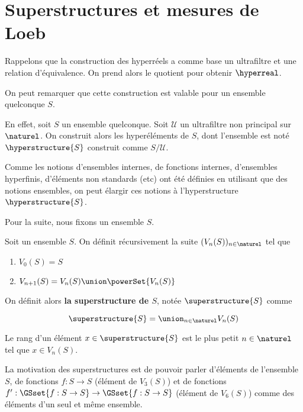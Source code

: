 \chapter{Superstructures et mesures de Loeb}

Rappelons que la construction des hyperréels a comme base un ultrafiltre et une
relation d'équivalence. On prend alors le quotient pour obtenir $\hyperreal$.

On peut remarquer que cette construction est valable pour un ensemble quelconque
$S$.

En effet, soit $S$ un ensemble quelconque. Soit $\mathcal{U}$ un ultrafiltre non
principal sur $\naturel$. On construit alors les hyperéléments de $S$, dont
l'ensemble est noté $\hyperstructure{S}$ construit comme
$S/\mathcal{U}$.

Comme les notions d'ensembles internes, de fonctions internes, d'ensembles
hyperfinis, d'éléments non standards (etc) ont été définies en utilisant que des
notions ensembles, on peut élargir ces notions à l'hyperstructure
$\hyperstructure{S}$.

Pour la suite, nous fixons un ensemble $S$.


\begin{definition} [Superstructure]
	Soit un ensemble $S$. On définit récursivement la suite $(V_{n}(S))_{n
	\in \naturel}$ tel que
	\begin{enumerate}
		\item $V_{0}(S) = S$
		\item $V_{n + 1}(S) = V_{n}(S) \union \powerSet{V_{n}(S)}$
	\end{enumerate}

	On définit alors \textbf{la superstructure de $S$}, notée
	$\superstructure{S}$ comme

	\begin{equation}
		\superstructure{S} = \union_{n \in \naturel}V_{n}(S)
	\end{equation}

	Le rang d'un élément $x \in \superstructure{S}$ est le plus petit $n \in
	\naturel$ tel que $x \in V_{n}(S)$.
\end{definition}

La motivation des superstructures est de pouvoir parler d'éléments de l'ensemble
$S$, de fonctions $f : S \rightarrow S$ (élément de $V_{3}(S)$) et de fonctions
$f' : \GSset{f : S \rightarrow S} \rightarrow \GSset{f : S \rightarrow S}$
(élément de $V_{6}(S)$) comme des éléments d'un seul et même ensemble.

